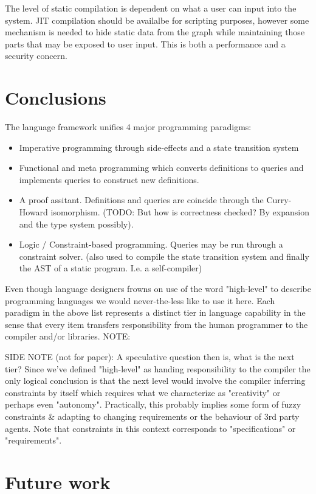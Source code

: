 \documentclass[11pt]{article}
\begin{document}
The level of static compilation is dependent on what a user can input into the system. JIT compilation should be availalbe for scripting purposes, however some mechanism is needed to hide static data 
from the graph while maintaining those parts that may be exposed to user input.
This is both a performance and a security concern.



\section*{Conclusions}

The language framework unifies 4 major programming paradigms: 
\begin{itemize}
\item Imperative programming through side-effects and a state transition system
\item Functional and meta programming which converts definitions to queries and implements queries to construct new definitions.
\item A proof assitant. Definitions and queries are coincide through the Curry-Howard isomorphism. (TODO: But how is correctness checked? By expansion and the type system possibly).
\item Logic / Constraint-based programming. Queries may be run through a constraint solver. (also used to compile the state transition system and finally the AST of a static program. I.e. a self-compiler)
\end{itemize}

Even though language designers frowns on use of the word "high-level" to describe programming languages we would never-the-less like to use it here. 
Each paradigm in the above list represents a distinct tier in language capability in the sense that every item transfers responsibility from the human programmer to the compiler and/or libraries. NOTE: 

SIDE NOTE (not for paper): A speculative question then is, what is the next tier? Since we've defined "high-level" as handing responsibility to the compiler the only logical conclusion is that the next level would involve
the compiler inferring constraints by itself which requires what we characterize as "creativity" or perhaps even "autonomy". Practically, this probably implies some form of fuzzy constraints \& adapting to changing requirements or the behaviour of 3rd party agents.
Note that constraints in this context corresponds to "specifications" or "requirements".

\section*{Future work}



\end{document}
